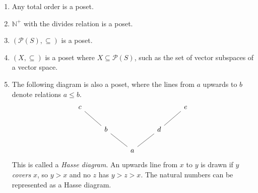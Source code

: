 \begin{example}
    \begin{enumerate}
        \item Any total order is a poset.
        \item \( \mathbb N^+ \) with the divides relation is a poset.
        \item \( (\mathcal P(S), \subseteq) \) is a poset.
        \item \( (X, \subseteq) \) is a poset where \( X \subseteq \mathcal P(S) \), such as the set of vector subspaces of a vector space.
\item The following diagram is also a poset, where the lines from \( a \) upwards to \( b \) denote relations \( a \leq b \).
\[\begin{tikzcd}
	c &&&& e \\
	& b && d \\
	&& a
	\arrow[no head, from=3-3, to=2-2]
	\arrow[no head, from=2-2, to=1-1]
	\arrow[no head, from=3-3, to=2-4]
	\arrow[no head, from=2-4, to=1-5]
\end{tikzcd}\]
This is called a \emph{Hasse diagram}.
An upwards line from \( x \) to \( y \) is drawn if \( y \) \emph{covers} \( x \), so \( y > x \) and no \( z \) has \( y > z > x \).
The natural numbers can be represented as a Hasse diagram.


\end{enumerate}
\end{example}
